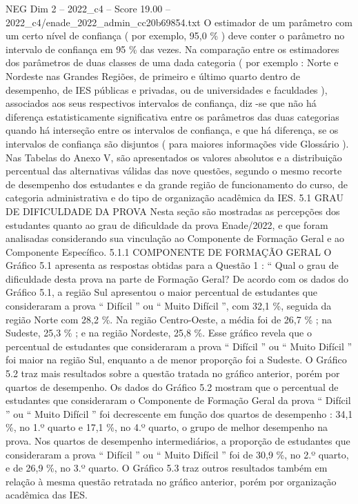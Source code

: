 \begin{textsample}{NEG Dim 2 – 2022\_c4 – Score 19.00 – 2022\_c4/enade\_2022\_admin\_cc20b69854.txt}
O estimador de um parâmetro com um certo nível de confiança ( por exemplo, 95,0 \% ) deve conter o parâmetro no intervalo de confiança em 95 \% das vezes.
Na comparação entre os estimadores dos parâmetros de duas classes de uma dada categoria ( por exemplo : Norte e Nordeste nas Grandes Regiões, de primeiro e último quarto dentro de desempenho, de IES públicas e privadas, ou de universidades e faculdades ), associados aos seus respectivos intervalos de confiança, diz -se que não há diferença estatisticamente significativa entre os parâmetros das duas categorias quando há interseção entre os intervalos de confiança, e que há diferença, se os intervalos de confiança são disjuntos ( para maiores informações vide Glossário ).
Nas Tabelas do Anexo V, são apresentados os valores absolutos e a distribuição percentual das alternativas válidas das nove questões, segundo o mesmo recorte de desempenho dos estudantes e da grande região de funcionamento do curso, de categoria administrativa e do tipo de organização acadêmica da IES. 5.1 GRAU DE DIFICULDADE DA PROVA Nesta seção são mostradas as percepções dos estudantes quanto ao grau de dificuldade da prova Enade/2022, e que foram analisadas considerando sua vinculação ao Componente de Formação Geral e ao Componente Específico. 5.1.1 COMPONENTE DE FORMAÇÃO GERAL O Gráfico 5.1 apresenta as respostas obtidas para a Questão 1 : “ Qual o grau de dificuldade desta prova na parte de Formação Geral?
De acordo com os dados do Gráfico 5.1, a região Sul apresentou o maior percentual de estudantes que consideraram a prova “ Difícil ” ou “ Muito Difícil ”, com 32,1 \%, seguida da região Norte com 28,2 \%.
Na região Centro-Oeste, a média foi de 26,7 \% ; na Sudeste, 25,3 \% ; e na região Nordeste, 25,8 \%.
Esse gráfico revela que o percentual de estudantes que consideraram a prova “ Difícil ” ou “ Muito Difícil ” foi maior na região Sul, enquanto a de menor proporção foi a Sudeste.
O Gráfico 5.2 traz mais resultados sobre a questão tratada no gráfico anterior, porém por quartos de desempenho.
Os dados do Gráfico 5.2 mostram que o percentual de estudantes que consideraram o Componente de Formação Geral da prova “ Difícil ” ou “ Muito Difícil ” foi decrescente em função dos quartos de desempenho : 34,1 \%, no 1.º quarto e 17,1 \%, no 4.º quarto, o grupo de melhor desempenho na prova.
Nos quartos de desempenho intermediários, a proporção de estudantes que consideraram a prova “ Difícil ” ou “ Muito Difícil ” foi de 30,9 \%, no 2.º quarto, e de 26,9 \%, no 3.º quarto.
O Gráfico 5.3 traz outros resultados também em relação à mesma questão retratada no gráfico anterior, porém por organização acadêmica das IES.

\end{textsample}
